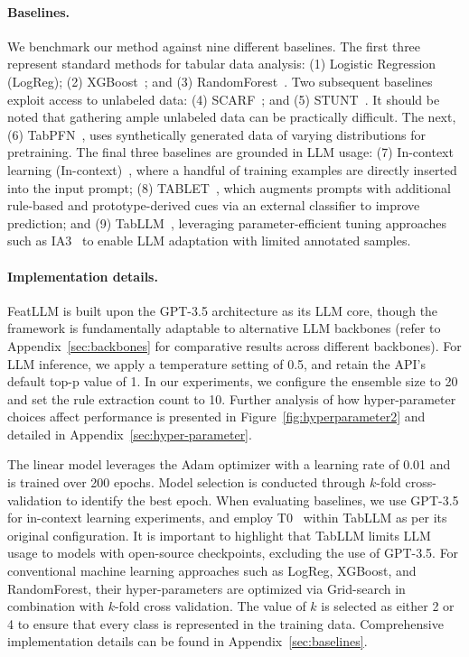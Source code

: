 \vspace*{-0.12in}
\paragraph{Baselines.}
We benchmark our method against nine different baselines. The first three represent standard methods for tabular data analysis: (1) Logistic Regression (LogReg); (2) XGBoost~\cite{chen2016xgboost}; and (3) RandomForest~\cite{ho1995random}. Two subsequent baselines exploit access to unlabeled data: (4) SCARF~\cite{bahri2022scarf}; and (5) STUNT~\cite{nam2023stunt}. It should be noted that gathering ample unlabeled data can be practically difficult. The next, (6) TabPFN~\cite{hollmann2022tabpfn}, uses synthetically generated data of varying distributions for pretraining. The final three baselines are grounded in LLM usage: (7) In-context learning (In-context)~\cite{wei2022emergent}, where a handful of training examples are directly inserted into the input prompt; (8) TABLET~\cite{slack2023tablet}, which augments prompts with additional rule-based and prototype-derived cues via an external classifier to improve prediction; and (9) TabLLM~\cite{hegselmann2023tabllm}, leveraging parameter-efficient tuning approaches such as IA3~\cite{liu2022few} to enable LLM adaptation with limited annotated samples.

\vspace*{-0.12in}
\paragraph{Implementation details.}
\textsf{FeatLLM} is built upon the GPT-3.5 architecture as its LLM core, though the framework is fundamentally adaptable to alternative LLM backbones (refer to Appendix~\ref{sec:backbones} for comparative results across different backbones). For LLM inference, we apply a temperature setting of 0.5, and retain the API's default top-p value of 1. In our experiments, we configure the ensemble size to 20 and set the rule extraction count to 10. Further analysis of how hyper-parameter choices affect performance is presented in Figure~\ref{fig:hyperparameter2} and detailed in Appendix~\ref{sec:hyper-parameter}.

The linear model leverages the Adam optimizer with a learning rate of 0.01 and is trained over 200 epochs. Model selection is conducted through $k$-fold cross-validation to identify the best epoch. When evaluating baselines, we use GPT-3.5 for in-context learning experiments, and employ T0~\cite{sanh2022multitask} within TabLLM as per its original configuration. It is important to highlight that TabLLM limits LLM usage to models with open-source checkpoints, excluding the use of GPT-3.5. For conventional machine learning approaches such as LogReg, XGBoost, and RandomForest, their hyper-parameters are optimized via Grid-search in combination with $k$-fold cross validation. The value of $k$ is selected as either 2 or 4 to ensure that every class is represented in the training data. Comprehensive implementation details can be found in Appendix~\ref{sec:baselines}.

